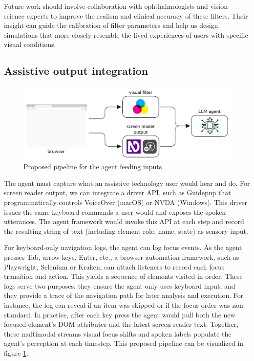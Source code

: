 Future work should involve collaboration with ophthalmologists and vision science experts to improve the realism and clinical accuracy of these filters. Their insight can guide the calibration of filter parameters and help us design simulations that more closely resemble the lived experiences of users with specific visual conditions.

\subsection{Assistive output integration}

\begin{figure}
    \centering
    \includegraphics[width=1\linewidth]{imgs/flow.png}
\caption{Proposed pipeline for the agent feeding inputs}
\label{fig:pipeline}
\end{figure}


The agent must capture what an assistive technology user would hear and do. For screen reader output, we can integrate a driver API, such as Guidepup that programmatically controls VoiceOver (macOS) or NVDA (Windows). This driver issues the same keyboard commands a user would and exposes the spoken utterances\cite{guidepup2025}. The agent framework would invoke this API at each step and record the resulting string of text (including element role, name, state) as sensory input.

For keyboard-only navigation logs, the agent can log focus events. As the agent presses Tab, arrow keys, Enter, etc., a browser automation framework, such as Playwright, Selenium or Kraken, can attach listeners to record each focus transition and action. This yields a sequence of elements visited in order\cite{ravelo2023kraken}. These logs serve two purposes: they ensure the agent only uses keyboard input, and they provide a trace of the navigation path for later analysis and execution. For instance, the log can reveal if an item was skipped or if the focus order was non-standard. In practice, after each key press the agent would pull both the new focused element's DOM attributes and the latest screen-reader text. Together, these multimodal streams visual focus shifts and spoken labels populate the agent's perception at each timestep. This proposed pipeline can be visualized in figure \ref{fig:pipeline}.

